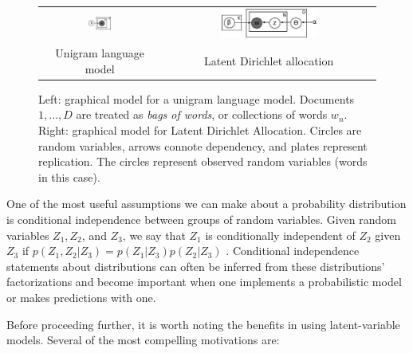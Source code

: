 \begin{figure}
  \begin{center}
    \begin{tabular}{cc}
      \includegraphics[width=0.2\textwidth]{chapter_introductory_material/figs/bagofwords_gm.pdf} & 
      \includegraphics[width=0.4667\textwidth]{chapter_introductory_material/figs/lda_gm.pdf} \\
      Unigram language model & Latent Dirichlet allocation \\
    \end{tabular}
  \end{center}
  \caption{Left: graphical model for a unigram language model.
    Documents $1, \ldots, D$ are treated as \emph{bags of words}, or
    collections of words $w_n$.  Right: graphical model for Latent
    Dirichlet Allocation.  Circles are random variables, arrows
    connote dependency, and plates represent replication.  The circles
    represent observed random variables (words in this case).}
  \label{fig:bagofwords_lda_gm}
\end{figure}

One of the most useful assumptions we can make about a probability
distribution is conditional independence between groups of random
variables.  Given random variables $Z_1, Z_2$, and $Z_3$, we say that
$Z_1$ is conditionally independent of $Z_2$ given $Z_3$ if $p(Z_1, Z_2
| Z_3) = p(Z_1 | Z_3) p(Z_2 | Z_3)$ \citep{bishop:2006}.  Conditional
independence statements about distributions can often be inferred from
these distributions' factorizations \citep{bishop:2006} and become
important when one implements a probabilistic model or makes
predictions with one.

Before proceeding further, it is worth noting the benefits in using
latent-variable models.  Several of the most compelling motivations are:

